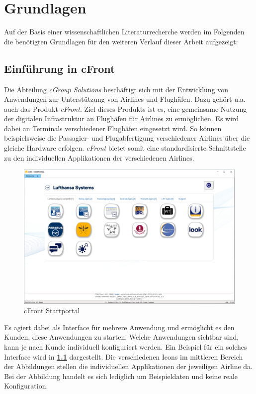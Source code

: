 \chapter{Grundlagen}
Auf der Basis einer wissenschaftlichen Literaturrecherche werden im Folgenden die benötigten Grundlagen für den weiteren Verlauf dieser Arbeit aufgezeigt:

\section{Einführung in cFront} \label{cFront-exp}
Die Abteilung \textit{cGroup Solutions} beschäftigt sich mit der Entwicklung von Anwendungen zur Unterstützung von Airlines und Flughäfen. Dazu gehört u.a. auch das Produkt \textit{cFront}. Ziel dieses Produkts ist es, eine gemeinsame Nutzung der digitalen Infrastruktur an Flughäfen für Airlines zu ermöglichen.
Es wird dabei an Terminals verschiedener Flughäfen eingesetzt wird. So können beispielsweise die Passagier- und Flugabfertigung verschiedener Airlines über die gleiche Hardware erfolgen. \textit{cFront} bietet somit eine standardisierte Schnittstelle zu den individuellen Applikationen der verschiedenen Airlines.

\begin{figure}[h]
	\centering 
	\includegraphics[width=1\textwidth]{img/abbildungen/MicrosoftTeams-image (3).png}
	\captionsetup{format=hang}
	\caption{cFront Startportal} \label{cFront}
\end{figure}

Es agiert dabei als Interface für mehrere Anwendung und ermöglicht es den Kunden, diese Anwendungen zu starten. Welche Anwendungen sichtbar sind, kann je nach Kunde individuell konfiguriert werden. Ein Beispiel für ein solches Interface wird in \textbf{\ref{cFront}} dargestellt.
Die verschiedenen Icons im mittleren Bereich der Abbildungen stellen die individuellen Applikationen der jeweiligen Airline da. Bei der Abbildung handelt es sich lediglich um Beispieldaten und keine reale Konfiguration.


